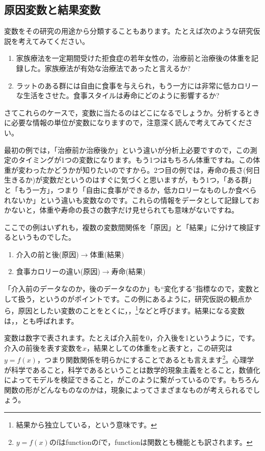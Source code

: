 \documentclass{ltjsbook}
\begin{document}
\subsection{原因変数と結果変数}
変数をその研究の用途から分類することもあります。たとえば次のような研究仮説を考えてみてください。
\begin{enumerate}
	\item 家族療法を一定期間受けた拒食症の若年女性の，治療前と治療後の体重を記録した。家族療法が有効な治療法であったと言えるか?
	\item ラットのある群には自由に食事を与えられ，もう一方には非常に低カロリーな生活をさせた。食事スタイルは寿命にどのように影響するか?
\end{enumerate}
さてこれらのケースで，変数に当たるのはどこになるでしょうか。分析するときに必要な情報の単位が変数になりますので，注意深く読んで考えてみてください。

最初の例では，「治療前か治療後か」という違いが分析上必要ですので，この測定のタイミングが1つの変数になります。もう1つはもちろん体重ですね。この体重が変わったかどうかが知りたいのですから。2つ目の例では，寿命の長さ(何日生きるか)が変数だというのはすぐに気づくと思いますが，もう1つ，「ある群」と「もう一方」，つまり「自由に食事ができるか，低カロリーなものしか食べられないか」という違いも変数なのです。これらの情報をデータとして記録しておかないと，体重や寿命の長さの数字だけ見せられても意味がないですね。

ここでの例はいずれも，複数の変数間関係を「原因」と「結果」に分けて検証するというものでした。
\begin{enumerate}
	\item 介入の前と後(原因)$\to$体重(結果)
	\item 食事カロリーの違い(原因)$\to$寿命(結果)
\end{enumerate}
「介入前のデータなのか，後のデータなのか」も``変化する''指標なので，変数として扱う，というのがポイントです。この例にあるように，研究仮説の観点から，原因としたい変数のことをとくに，，\footnote{結果から独立している，という意味です。}などと呼びます。結果になる変数は，，とも呼ばれます。

変数は数字で表されます。たとえば介入前を0，介入後を1というように，です。介入の前後を表す変数を$x$，結果としての体重を$y$と表すと，この研究は$y=f(x)$，つまり関数関係を明らかにすることであるとも言えます\footnote{$y=f(x)$のfはfunctionのfで，functionは関数とも機能とも訳されます。}。心理学が科学であること，科学であるということは数学的現象主義をとること，数値化によってモデルを検証できること，がこのように繋がっているのです。もちろん関数の形がどんなものなのかは，現象によってさまざまなものが考えられるでしょう。
\end{document}
